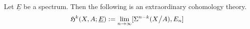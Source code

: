 \documentclass[a4paper,12pt]{article}
\begin{document}








    

\begin{theodef}\label{spectrum cohomology}
    Let \(\underline{E}\) be a spectrum. Then the following is an extraordinary cohomology theory.
    \[\mathfrak{H}^k(X,A;\underline{E}):=\lim_{n\to\infty}[\Sigma^{n-k}(X\big/A),E_n]\]
\end{theodef}
\end{document}
